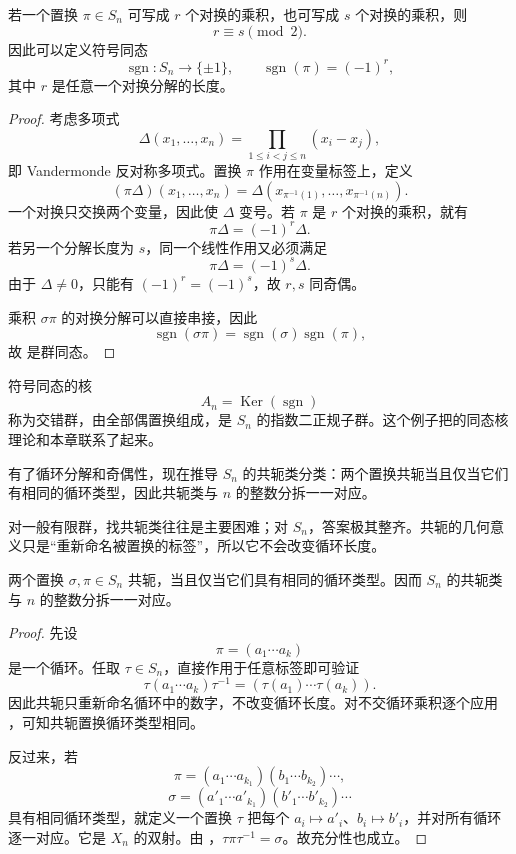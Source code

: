 \begin{theorem}[置换奇偶性的良定义性]
若一个置换 $\pi\in S_n$ 可写成 $r$ 个对换的乘积，也可写成 $s$ 个对换的乘积，则
\[
r\equiv s\pmod 2.
\]
因此可以定义符号同态
\begin{equation}
\operatorname{sgn}:S_n\to\{\pm1\},
\qquad
\operatorname{sgn}(\pi)=(-1)^r,
\label{eq:sign-homomorphism}
\end{equation}
其中 $r$ 是任意一个对换分解的长度。

\end{theorem}

\begin{proof}
考虑多项式
\[
\Delta(x_1,\dots,x_n)=\prod_{1\le i<j\le n}(x_i-x_j),
\]
即 Vandermonde 反对称多项式。置换 $\pi$ 作用在变量标签上，定义
\[
(\pi\Delta)(x_1,\dots,x_n)
=\Delta(x_{\pi^{-1}(1)},\dots,x_{\pi^{-1}(n)}).
\]
一个对换只交换两个变量，因此使 $\Delta$ 变号。若 $\pi$ 是 $r$ 个对换的乘积，就有
\[
\pi\Delta=(-1)^r\Delta.
\]
若另一个分解长度为 $s$，同一个线性作用又必须满足
\[
\pi\Delta=(-1)^s\Delta.
\]
由于 $\Delta\neq0$，只能有 $(-1)^r=(-1)^s$，故 $r,s$ 同奇偶。

乘积 $\sigma\pi$ 的对换分解可以直接串接，因此
\[
\operatorname{sgn}(\sigma\pi)=\operatorname{sgn}(\sigma)\operatorname{sgn}(\pi),
\]
故  是群同态。
\end{proof}

符号同态的核
\[
A_n=\operatorname{Ker}(\operatorname{sgn})
\]
称为交错群，由全部偶置换组成，是 $S_n$ 的指数二正规子群。这个例子把的同态核理论和本章联系了起来。

有了循环分解和奇偶性，现在推导 $S_n$ 的共轭类分类：两个置换共轭当且仅当它们有相同的循环类型，因此共轭类与 $n$ 的整数分拆一一对应。

对一般有限群，找共轭类往往是主要困难；对 $S_n$，答案极其整齐。共轭的几何意义只是“重新命名被置换的标签”，所以它不会改变循环长度。

\begin{theorem}[$S_n$ 的共轭类分类]
两个置换 $\sigma,\pi\in S_n$ 共轭，当且仅当它们具有相同的循环类型。因而 $S_n$ 的共轭类与 $n$ 的整数分拆一一对应。

\end{theorem}

\begin{proof}
先设
\[
\pi=(a_1\cdots a_k)
\]
是一个循环。任取 $\tau\in S_n$，直接作用于任意标签即可验证
\begin{equation}
\tau(a_1\cdots a_k)\tau^{-1}
=(\tau(a_1)\cdots\tau(a_k)).
\label{eq:cycle-conjugation}
\end{equation}
因此共轭只重新命名循环中的数字，不改变循环长度。对不交循环乘积逐个应用 ，可知共轭置换循环类型相同。

反过来，若
\[
\pi=(a_1\cdots a_{k_1})(b_1\cdots b_{k_2})\cdots,
\]
\[
\sigma=(a'_1\cdots a'_{k_1})(b'_1\cdots b'_{k_2})\cdots
\]
具有相同循环类型，就定义一个置换 $\tau$ 把每个 $a_i\mapsto a'_i$、$b_i\mapsto b'_i$，并对所有循环逐一对应。它是 $X_n$ 的双射。由 ，$\tau\pi\tau^{-1}=\sigma$。故充分性也成立。
\end{proof}

